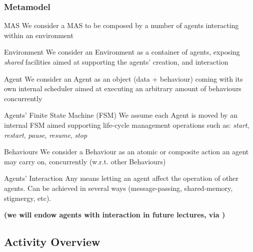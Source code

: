 \documentclass[presentation]{beamer}\mode<presentation>{\usetheme{AMSCesenaPurpleAndGold}}
\begin{document}
\begin{frame}[allowframebreaks]
\frametitle{Metamodel}

	\begin{block}{MAS}
	    We consider a MAS to be composed by a number of agents \alert{interacting} within an environment
	\end{block}

	\bigskip
	
	\begin{block}{Environment}
		We consider an Environment as a container of agents, exposing \emph{shared} facilities aimed at \alert{supporting} the agents' \alert{creation}, and \alert{interaction}
	\end{block}
	
	\bigskip
	
	\begin{block}{Agent}
	    We consider an Agent as an object (data + behaviour) coming with its own \alert{internal scheduler} aimed at executing an arbitrary amount of \alert{behaviours} concurrently
	\end{block}
	
	\bigskip
	
	\begin{block}{Agents' Finite State Machine (FSM)}
		We assume each Agent is moved by an internal FSM aimed supporting life-cycle management operations such as: \emph{start}, \emph{restart}, \emph{pause}, \emph{resume}, \emph{stop}	
	\end{block}
	
	\bigskip
	
	\begin{block}{Behaviours}
		We consider a Behaviour as an atomic or composite action an agent may carry on, concurrently (w.r.t. other Behaviours)
	\end{block}
	
	\bigskip
	
	\begin{block}{Agents' Interaction}
		Any means letting an agent affect the operation of other agents.
		Can be achieved in several ways (message-passing, shared-memory, stigmergy, etc).
		\begin{center}\bfseries
			(we will endow agents with interaction in future lectures, via \linda{})
		\end{center}
	\end{block}

\end{frame}

\subsection{Activity Overview}
\end{document}
